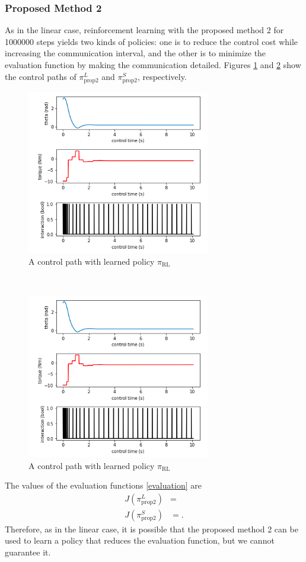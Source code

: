 \documentclass[english, dvipdfmx]{ampmt}             %
\begin{document}
\subsubsection{Proposed Method 2}
As in the linear case, reinforcement learning with the proposed method 2 for 1000000 steps yields two kinds of policies: one is to reduce the control cost while increasing the communication interval, and the other is to minimize the evaluation function by making the communication detailed. Figures \ref{nonlinear_good} and \ref{nonlinear_bad} show the control paths of $\pi_{\textrm{prop}2}^L$ and $\pi_{\textrm{prop}2}^S$, respectively.
\begin{figure}[h]
	\centering
 	\includegraphics[width=8cm]{path_1.png}
 	\caption{A control path with learned policy $\pi_{\textrm{RL}}$} \label{nonlinear_good}
\end{figure}\\
\begin{figure}[h]
	\centering
 	\includegraphics[width=8cm]{path_1.png}
 	\caption{A control path with learned policy $\pi_{\textrm{RL}}$} \label{nonlinear_bad}
\end{figure}
The values of the evaluation functions \ref{evaluation} are 
\begin{align}
	J(\pi_{\textrm{prop}2}^L) &= \\
	J(\pi_{\textrm{prop}2}^S) &= .
\end{align}
Therefore, as in the linear case, it is possible that the proposed method 2 can be used to learn a policy that reduces the evaluation function, but we cannot guarantee it. 
\fi
\end{document}
